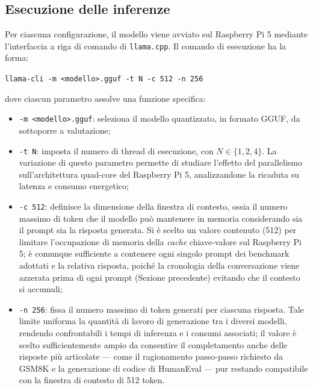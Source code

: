 \subsection{Esecuzione delle inferenze}

Per ciascuna configurazione, il modello viene avviato sul Raspberry Pi 5 mediante
l'interfaccia a riga di comando di \texttt{llama.cpp}. Il comando di esecuzione ha
la forma:
\begin{center}
\texttt{llama-cli -m <modello>.gguf -t N -c 512 -n 256}
\end{center}
dove ciascun parametro assolve una funzione specifica:
\begin{itemize}
    \item \texttt{-m <modello>.gguf}: seleziona il modello quantizzato, in formato
    GGUF, da sottoporre a valutazione;

    \item \texttt{-t N}: imposta il numero di thread di esecuzione, con
    $N \in \{1, 2, 4\}$. La variazione di questo parametro permette di studiare
    l'effetto del parallelismo sull'architettura quad-core del Raspberry Pi 5,
    analizzandone la ricaduta su latenza e consumo energetico;

    \item \texttt{-c 512}: definisce la dimensione della finestra di contesto, ossia
    il numero massimo di token che il modello può mantenere in memoria considerando
    sia il prompt sia la risposta generata. Si è scelto un valore contenuto (512) per
    limitare l'occupazione di memoria della \textit{cache} chiave-valore sul Raspberry
    Pi 5; è comunque sufficiente a contenere ogni singolo prompt dei benchmark adottati
    e la relativa risposta, poiché la cronologia della conversazione viene azzerata
    prima di ogni prompt (Sezione precedente) evitando che il contesto si accumuli;

    \item \texttt{-n 256}: fissa il numero massimo di token generati per ciascuna
    risposta. Tale limite uniforma la quantità di lavoro di generazione tra i diversi
    modelli, rendendo confrontabili i tempi di inferenza e i consumi associati; il
    valore è scelto sufficientemente ampio da consentire il completamento anche delle
    risposte più articolate --- come il ragionamento passo-passo richiesto da GSM8K e
    la generazione di codice di HumanEval --- pur restando compatibile con la finestra
    di contesto di 512 token.
\end{itemize}

